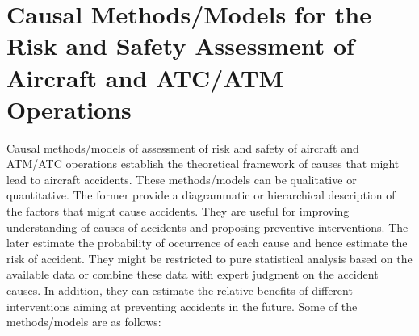 \documentclass[a4paper, 10pt]{article}
\begin{document}
\section{Causal Methods/Models for the Risk and Safety Assessment of Aircraft and ATC/ATM Operations}

Causal methods/models of assessment of risk and safety of
aircraft and ATM/ATC operations establish the theoretical
framework of causes that might lead to aircraft accidents.
These methods/models can be qualitative or quantitative. The
former provide a diagrammatic or hierarchical description of
the factors that might cause accidents. They are useful for
improving understanding of causes of accidents and proposing
preventive interventions. The later estimate the probability of
occurrence of each cause and hence estimate the risk of
accident. They might be restricted to pure statistical analysis
based on the available data or combine these data with expert
judgment on the accident causes. In addition, they can estimate
the relative benefits of different interventions aiming at
preventing accidents in the future. Some of the
methods/models are as follows:
\end{document}
